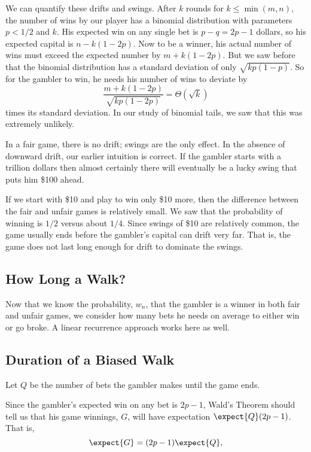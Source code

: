 We can quantify these drifts and swings.  After $k$ rounds for $k \le
\min(m,n)$, the number of wins by our player has a binomial distribution
with parameters $p < 1/2$ and $k$.  His expected win on any single bet is
$p-q = 2p-1$ dollars, so his expected capital is $n-k(1-2p)$.  Now to be a
winner, his actual number of wins must exceed the expected number by
$m+k(1-2p)$.  But we saw before that the binomial distribution has a
standard deviation of only $\sqrt{kp(1-p)}$.  So for the gambler to win,
he needs his number of wins to deviate by
\[
\frac{m+k(1-2p)}{\sqrt{kp(1-2p)}}=\Theta(\sqrt{k})
\]
times its standard deviation.  In our study of binomial tails, we saw that
this was extremely unlikely.

In a fair game, there is no drift; swings are the only effect.  In the
absence of downward drift, our earlier intuition is correct.  If the
gambler starts with a trillion dollars then almost certainly there
will eventually be a lucky swing that puts him \$100 ahead.

\begin{editingnotes}
If we start with \$10 and play to win only \$10 more, then the difference
between the fair and unfair games is relatively small. We saw that the
probability of winning is $1/2$ versus about $1/4$.  Since swings of \$10
are relatively common, the game usually ends before the gambler's capital
can drift very far.  That is, the game does not last long enough for drift
to dominate the swings.
\end{editingnotes}


\subsection{How Long a Walk?}

Now that we know the probability, $w_n$, that the gambler is a winner in
both fair and unfair games, we consider how many bets he needs on average
to either win or go broke.  A linear recurrence approach works here as well. 

\iffalse
\subsection{Duration of a Biased Walk}

Let $Q$ be the number of bets the gambler makes until the game ends.  

Since the gambler's expected win on any bet is $2p-1$, Wald's
Theorem should tell us that his game winnings, $G$, will have
expectation $\expect{Q}(2p-1)$.  That is,
\begin{equation}\label{LN12:gw}
\expect{G} = (2p-1)\expect{Q},
\end{equation}

